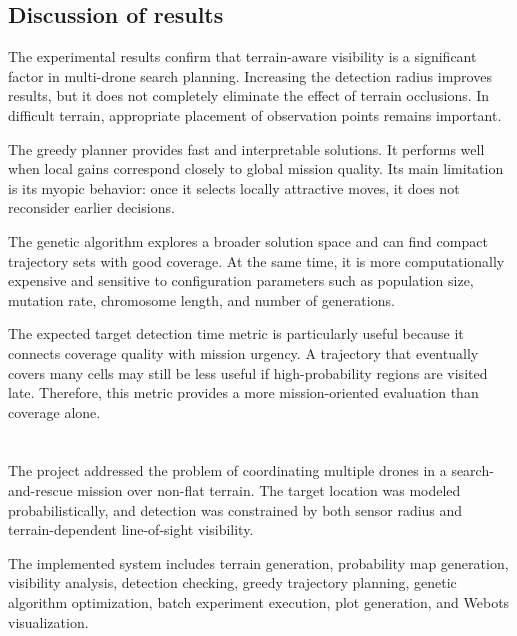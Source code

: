 \documentclass[english]{projectreport}
\begin{document}
\subsection{Discussion of results}

The experimental results confirm that terrain-aware visibility is a significant
factor in multi-drone search planning. Increasing the detection radius improves
results, but it does not completely eliminate the effect of terrain occlusions.
In difficult terrain, appropriate placement of observation points remains
important.

The greedy planner provides fast and interpretable solutions. It performs well
when local gains correspond closely to global mission quality. Its main
limitation is its myopic behavior: once it selects locally attractive moves, it
does not reconsider earlier decisions.

The genetic algorithm explores a broader solution space and can find compact
trajectory sets with good coverage. At the same time, it is more computationally
expensive and sensitive to configuration parameters such as population size,
mutation rate, chromosome length, and number of generations.

The expected target detection time metric is particularly useful because it
connects coverage quality with mission urgency. A trajectory that eventually
covers many cells may still be less useful if high-probability regions are
visited late. Therefore, this metric provides a more mission-oriented evaluation
than coverage alone.

\section{\SectionTitleSummary}

The project addressed the problem of coordinating multiple drones in a
search-and-rescue mission over non-flat terrain. The target location was modeled
probabilistically, and detection was constrained by both sensor radius and
terrain-dependent line-of-sight visibility.

The implemented system includes terrain generation, probability map generation,
visibility analysis, detection checking, greedy trajectory planning, genetic
algorithm optimization, batch experiment execution, plot generation, and Webots
visualization.
\end{document}
